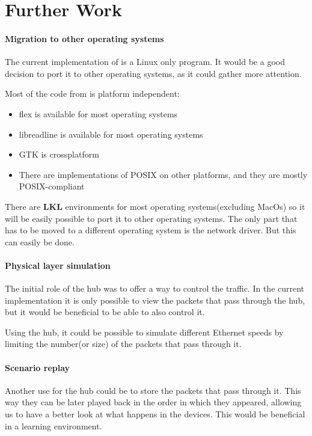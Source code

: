 \chapter{Further Work}
\label{chapter:further}

\subsubsection{Migration to other operating systems}

The current implementation of \textbf{\project} is a Linux only program. It would be a good
decision to port it to other operating systems, as it could gather more attention. 

Most of the code from \project is platform independent:
\begin{itemize}
  \item flex is available for most operating systems
  \item libreadline is available for most operating systems
  \item GTK is crossplatform
  \item There are implementations of POSIX on other platforms, and they are mostly POSIX-compliant
\end{itemize}

There are \textbf{LKL} environments for most operating systems(excluding MacOs) so it will be easily possible to port it
to other operating systems. The only part that has to be moved to a different operating system is the network driver.
But this can easily be done.

\subsubsection{Physical layer simulation}

The initial role of the hub was to offer a way to control the traffic. In the current implementation it is
only possible to view the packets that pass through the hub, but it would be beneficial to be able to also control
it.

Using the hub, it could be possible to simulate different Ethernet speeds by limiting the number(or size) of the packets
that pass through it.

\subsubsection{Scenario replay}

Another use for the hub could be to store the packets that pass through it. This way they can be later played back in the
order in which they appeared, allowing us to have a better look at what happens in the devices. This would be beneficial
in a learning environment.

